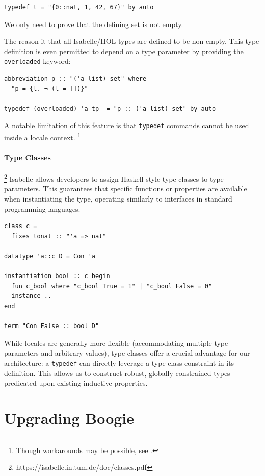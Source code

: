 \documentclass[11pt]{article}
\begin{document}
\begin{verbatim}
typedef t = "{0::nat, 1, 42, 67}" by auto
\end{verbatim}

We only need to prove that the defining set is not empty.

The reason it that all Isabelle/HOL types are defined to be non-empty.
This type definition is even permitted to depend on a type parameter by providing the \texttt{overloaded} keyword:

\begin{verbatim}
abbreviation p :: "('a list) set" where
  "p = {l. ¬ (l = [])}"

typedef (overloaded) 'a tp  = "p :: ('a list) set" by auto
\end{verbatim}

A notable limitation of this feature is that \texttt{typedef} commands cannot be used inside a locale context.
\footnote{Though workarounds may be possible, see \cite{kunvcar2016types}.}

\paragraph{Type Classes}\footnote{https://isabelle.in.tum.de/doc/classes.pdf}
Isabelle allows developers to assign Haskell-style type classes to type parameters.
This guarantees that specific functions or properties are available when instantiating the type,
operating similarly to interfaces in standard programming languages.

\begin{verbatim}
class c =
  fixes tonat :: "'a => nat"

datatype 'a::c D = Con 'a

instantiation bool :: c begin
  fun c_bool where "c_bool True = 1" | "c_bool False = 0"
  instance .. 
end

term "Con False :: bool D"
\end{verbatim}

While locales are generally more flexible (accommodating multiple type parameters and arbitrary values),
type classes offer a crucial advantage for our architecture:
a \texttt{typedef} can directly leverage a type class constraint in its definition. 
This allows us to construct robust, globally constrained types predicated upon existing inductive properties.


\section{Upgrading Boogie}
\label{sec:upgrading-boogie}
\end{document}

